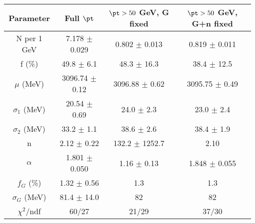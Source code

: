 \begin{tabular}{c||c|c|c}
Parameter & Full $\pt$ & $\pt>50$ GeV, G fixed & $\pt>50$ GeV, G+n fixed \\
\hline
N per 1 GeV & 7.178 $\pm$ 0.029 & 0.802 $\pm$ 0.013 & 0.819 $\pm$ 0.011\\
f (\%) & 49.8 $\pm$ 6.1 & 48.3 $\pm$ 16.3 & 38.4 $\pm$ 12.5\\
$\mu$ (MeV) & 3096.74 $\pm$ 0.12 & 3096.88 $\pm$ 0.62 & 3095.75 $\pm$ 0.49\\
$\sigma_1$ (MeV) & 20.54 $\pm$ 0.69 & 24.0 $\pm$ 2.3 & 23.0 $\pm$ 2.4\\
$\sigma_2$ (MeV) & 33.2 $\pm$ 1.1 & 38.6 $\pm$ 2.6 & 38.4 $\pm$ 1.9\\
n & 2.12 $\pm$ 0.22 & 132.2 $\pm$ 1252.7 & 2.10\\
$\alpha$ & 1.801 $\pm$ 0.050 & 1.16 $\pm$ 0.13 & 1.848 $\pm$ 0.055\\
$f_G$ (\%) & 1.32 $\pm$ 0.56 & 1.3 & 1.3\\
$\sigma_G$ (MeV) & 81.4 $\pm$ 14.0 & 82 & 82\\
\hline
$\chi^2$/ndf & 60/27 & 21/29 & 37/30\\
\end{tabular}
